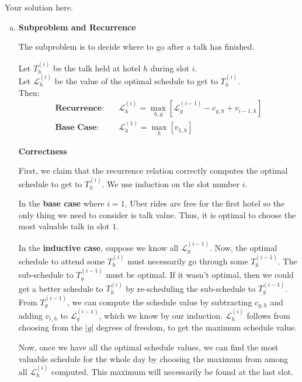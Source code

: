 \documentclass[10pt]{article}
\newcommand{\Ell}{\mathcal{L}}
\begin{document}
\begin{solution} Your solution here.

    \begin{enumerate}[(a)]
        \item {
            
            \textbf{Subproblem and Recurrence}
        
            The subproblem is to decide where to go after a talk has finished. 

            Let $T^{(i)}_h$ be the talk held at hotel $h$ during slot $i$. \\
            Let $\Ell^{(i)}_h$ be the value of the optimal schedule to get to 
            $T^{(i)}_h$. \\
            Then:
            \begin{align*}
                \textbf{Recurrence:} \quad & \Ell^{(i)}_h = \max_{h,g}[\Ell^{(i-1)}_{g} - c_{g,h} + v_{i-1,h}] \\
                \textbf{Base Case:} \quad & \Ell^{(1)}_h = \max_h[v_{1,h}]
            \end{align*}

            \textbf{Correctness}

            First, we claim that the recurrence relation correctly computes the 
            optimal schedule to get to $T^{(i)}_h$. 
            We use induction on the slot number $i$. 

            In the \textbf{base case} where $i=1$, Uber rides are free for the 
            first hotel so the only thing we need to consider is talk value. 
            Thus, it is optimal to choose the most valuable talk in slot $1$. 

            In the \textbf{inductive case}, suppose we know all $\Ell^{(i-1)}_g$. 
            Now, the optimal schedule to attend some $T^{(i)}_h$ must 
            necessarily go through some $T^{(i-1)}_g$. The sub-schedule to 
            $T^{(i-1)}_g$ must be optimal. 
            If it wasn't optimal, then we could get a better schedule to 
            $T^{(i)}_h$ by re-scheduling the sub-schedule to $T^{(i-1)}_g$. 
            From $T^{(i-1)}_g$, we can compute the schedule value by subtracting 
            $c_{g,h}$ and adding $v_{i,h}$ to $\Ell^{(i-1)}_g$, which we know 
            by our induction. 
            $\Ell^{(i)}_h$ follows from choosing from the $|g|$ degrees of 
            freedom, to get the maximum schedule value. 

            Now, once we have all the optimal schedule values, we can find the 
            most valuable schedule for the whole day by choosing the maximum 
            from among all $\Ell^{(i)}_h$ computed. 
            This maximum will necessarily be found at the last slot. 

}
\end{enumerate}
\end{solution}
\end{document}
